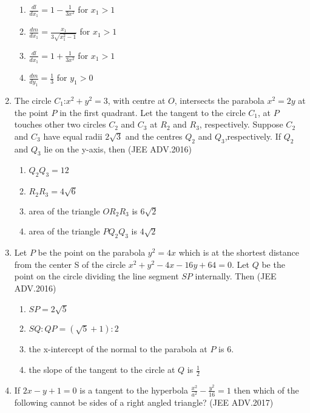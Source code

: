 \documentclass[journal,12pt,twocolumn]{IEEEtran}
\theoremstyle{remark}
\begin{document}
\begin{enumerate}
	      \begin{enumerate}
		      \item $\frac{dl}{dx_1}=1-\frac{1}{3x^2}$ for $x_1>1$ 
		      \item $\frac{dm}{dx_1}=\frac{x_1}{3\sqrt{x_1^2-1}}$ for $x_1>1$ 
		      \item $\frac{dl}{dx_1}=1+\frac{1}{3x^2}$ for $x_1>1$
		      \item $\frac{dm}{dy_1}=\frac{1}{3}$ for $y_1>0$ 
	      \end{enumerate}
      \item The circle $C_1$:$x^2+y^2=3$, with centre at $O$, intersects the parabola $x^2=2y$ at the point $P$ in the first quadrant. Let the tangent to the circle $C_1$, at $P$ touches other two circles $C_2$ and $C_3$ at $R_2$ and $R_3$, respectively. Suppose $C_2$ and $C_3$ have equal radii $2\sqrt{3}$ and the centres $Q_2$ and $Q_3$,respectively. If $Q_2$ and $Q_3$ lie on the y-axis, then 
	      \hfill(JEE ADV.2016)
	      
	      \begin{enumerate}
		      \item $Q_2Q_3=12$
		      \item $R_2R_3=4\sqrt{6}$
		      \item area of the triangle $OR_2R_3$ is $6\sqrt{2}$
		      \item area of the triangle $PQ_2Q_3$ is $4\sqrt{2}$
	      \end{enumerate}
      \item Let $P$ be the point on the parabola $y^2=4x$ which is at the shortest distance from the center S of the circle $x^2+y^2-4x-16y+64=0$. Let $Q$ be the point on the circle
	      dividing the line segment $SP$ internally. Then 
	      \hfill(JEE ADV.2016)
	      
	      \begin{enumerate}
		      \item $SP=2\sqrt{5}$
		      \item $SQ:QP=(\sqrt{5}+1):2$
		      \item the x-intercept of the normal to the parabola at $P$ is $6$.
		      \item the slope of the tangent to the circle at $Q$ is $\frac{1}{2}$
		      
	      \end{enumerate}
      \item If $2x-y+1=0$ is a tangent to the hyperbola $\frac{x^2}{a^2}-\frac{y^2}{16}=1$ then which of the following cannot be sides of a right angled triangle? 
	      \hfill(JEE ADV.2017)
	      

\end{enumerate}
\end{document}
